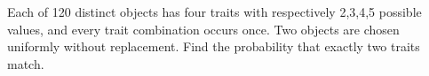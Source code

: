 Each of 120 distinct objects has four traits with respectively 2,3,4,5 possible values, and every trait combination occurs once. Two objects are chosen uniformly without replacement. Find the probability that exactly two traits match.
